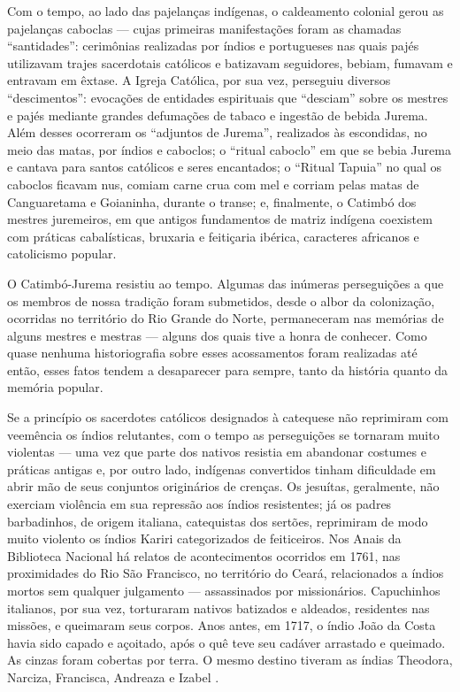 \begin{refsection}
    Com o tempo, ao lado das pajelanças indígenas, o caldeamento colonial gerou as pajelanças caboclas --- cujas primeiras manifestações foram as chamadas ``santidades'': cerimônias realizadas por índios e portugueses nas quais pajés utilizavam trajes sacerdotais católicos e batizavam seguidores, bebiam, fumavam e entravam em êxtase. A Igreja Católica, por sua vez, perseguiu diversos ``descimentos'': evocações de entidades espirituais que ``desciam'' sobre os mestres e pajés mediante grandes defumações de tabaco e ingestão de bebida Jurema. Além desses ocorreram os ``adjuntos de Jurema'', realizados às escondidas, no meio das matas, por índios e caboclos; o ``ritual caboclo'' em que se bebia Jurema e cantava para santos católicos e seres encantados; o ``Ritual Tapuia'' no qual os caboclos ficavam nus, comiam carne crua com mel e corriam pelas matas de Canguaretama e Goianinha, durante o transe; e, finalmente, o Catimbó dos mestres juremeiros, em que antigos fundamentos de matriz indígena coexistem com práticas cabalísticas, bruxaria e feitiçaria ibérica, caracteres africanos e catolicismo popular. 

    O Catimbó-Jurema resistiu ao tempo. Algumas das inúmeras perseguições a que os membros de nossa tradição foram submetidos, desde o albor da colonização, ocorridas no território do Rio Grande do Norte, permaneceram nas memórias de alguns mestres e mestras --- alguns dos quais tive a honra de conhecer. Como quase nenhuma historiografia sobre esses acossamentos foram realizadas até então, esses fatos tendem a desaparecer para sempre, tanto da história quanto da memória popular. 

    Se a princípio os sacerdotes católicos designados à catequese não reprimiram com veemência os índios relutantes, com o tempo as perseguições se tornaram muito violentas --- uma vez que parte dos nativos resistia em abandonar costumes e práticas antigas e, por outro lado, indígenas convertidos tinham dificuldade em abrir mão de seus conjuntos originários de crenças. Os jesuítas, geralmente, não exerciam violência em sua repressão aos índios resistentes; já os padres barbadinhos, de origem italiana, catequistas dos sertões, reprimiram de modo muito violento os índios Kariri categorizados de feiticeiros. Nos Anais da Biblioteca Nacional há relatos de acontecimentos ocorridos em 1761, nas proximidades do Rio São Francisco, no território do Ceará, relacionados a índios mortos sem qualquer julgamento --- assassinados por missionários. Capuchinhos italianos, por sua vez, torturaram nativos batizados e aldeados, residentes nas missões, e queimaram seus corpos. Anos antes, em 1717, o índio João da Costa havia sido capado e açoitado, após o quê teve seu cadáver arrastado e queimado. As cinzas foram cobertas por terra. O mesmo destino tiveram as índias Theodora, Narciza, Francisca, Andreaza e Izabel \cite[p.~103--104]{Siqueira1978}. 


\end{refsection}
